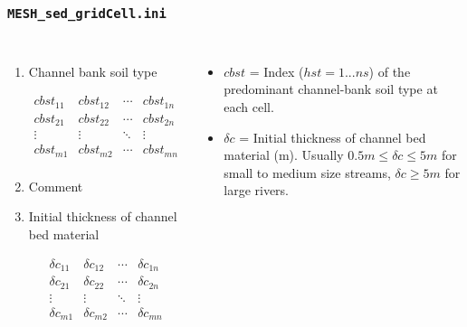 \documentclass{beamer}
\newcounter{ResumeEnumerate}
\begin{document}
\begin{frame}\frametitle{\texttt{MESH\_sed\_gridCell.ini}}
\begin{columns}
{\tiny
\begin{enumerate}[start=\numexpr\value{ResumeEnumerate}+1, label=Line \arabic*]\itemsep0em 
\item Channel bank soil type\\[-2.7em]
\begin{minipage}[t]{0.1\linewidth}
\begin{flushright}
$$
\begin{matrix} 
cbst_{11} & cbst_{12} & \cdots & cbst_{1n} \\
cbst_{21} & cbst_{22} & \cdots & cbst_{2n} \\
\vdots & \vdots & \ddots & \vdots \\
cbst_{m1} & cbst_{m2} & \cdots & cbst_{mn}\\
\end{matrix}
$$
\end{flushright}
\end{minipage}

\item Comment
\item Initial thickness of channel bed material \\[-2.7em]
\begin{minipage}[t]{0.1\linewidth}
\begin{flushright}
$$
\begin{matrix} 
\delta c_{11} & \delta c_{12} & \cdots & \delta c_{1n} \\
\delta c_{21} & \delta c_{22} & \cdots & \delta c_{2n} \\
\vdots & \vdots & \ddots & \vdots \\
\delta c_{m1} & \delta c_{m2} & \cdots & \delta c_{mn} \\
\end{matrix}
$$
\end{flushright}
\end{minipage}
\end{enumerate}
}
{\scriptsize 
\begin{itemize}
\item $cbst$ =  Index ($hst = 1 ... ns$) of the predominant channel-bank soil type at each cell.
\item $\delta c$ =  Initial thickness of channel bed material (m). Usually $0.5m \leq \delta c \leq 5m$ for small to medium size streams, $\delta c \geq 5m$ for large rivers.
\end{itemize}
}
\end{columns}
\end{frame}
\end{document}
